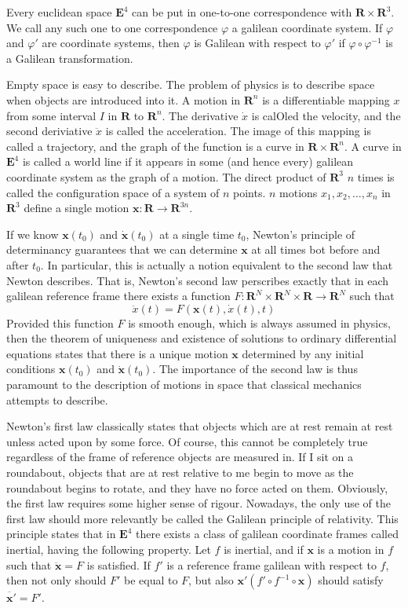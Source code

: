Every euclidean space $\mathbf{E}^4$ can be put in one-to-one correspondence with $\mathbf{R} \times \mathbf{R}^3$. We call any such one to one correspondence $\varphi$ a galilean coordinate system. If $\varphi$ and $\varphi'$ are coordinate systems, then $\varphi$ is Galilean with respect to $\varphi'$ if $\varphi \circ \varphi^{-1}$ is a Galilean transformation.

Empty space is easy to describe. The problem of physics is to describe space when objects are introduced into it. A motion in $\mathbf{R}^n$ is a differentiable mapping $x$ from some interval $I$ in $\mathbf{R}$ to $\mathbf{R}^n$. The derivative $\dot{x}$ is calOled the velocity, and the second deriviative $\ddot{x}$ is called the acceleration. The image of this mapping is called a trajectory, and the graph of the function is a curve in $\mathbf{R} \times \mathbf{R}^n$. A curve in $\mathbf{E}^4$ is called a world line if it appears in some (and hence every) galilean coordinate system as the graph of a motion. The direct product of $\mathbf{R}^3$ $n$ times is called the configuration space of a system of $n$ points. $n$ motions $x_1, x_2, \dots, x_n$ in $\mathbf{R}^3$ define a single motion $\mathbf{x}:\mathbf{R} \to \mathbf{R}^{3n}$.

If we know $\mathbf{x}(t_0)$ and $\dot{\mathbf{x}}(t_0)$ at a single time $t_0$, Newton's principle of determinancy guarantees that we can determine $\mathbf{x}$ at all times bot before and after $t_0$. In particular, this is actually a notion equivalent to the second law that Newton describes. That is, Newton's second law perscribes exactly that in each galilean reference frame there exists a function $F:\mathbf{R}^N \times \mathbf{R}^N \times \mathbf{R} \to \mathbf{R}^N$ such that
%
\[ \ddot{x}(t) = F(\mathbf{x}(t), \dot{x}(t), t) \]
%
Provided this function $F$ is smooth enough, which is always assumed in physics, then the theorem of uniqueness and existence of solutions to ordinary differential equations states that there is a unique motion $\mathbf{x}$ determined by any initial conditions $\mathbf{x}(t_0)$ and $\dot{\mathbf{x}}(t_0)$. The importance of the second law is thus paramount to the description of motions in space that classical mechanics attempts to describe.

Newton's first law classically states that objects which are at rest remain at rest unless acted upon by some force. Of course, this cannot be completely true regardless of the frame of reference objects are measured in. If I sit on a roundabout, objects that are at rest relative to me begin to move as the roundabout begins to rotate, and they have no force acted on them. Obviously, the first law requires some higher sense of rigour. Nowadays, the only use of the first law should more relevantly be called the Galilean principle of relativity. This principle states that in $\mathbf{E}^4$ there exists a class of galilean coordinate frames called inertial, having the following property. Let $f$ is inertial, and if $\mathbf{x}$ is a motion in $f$ such that $\ddot{\mathbf{x}} = F$ is satisfied. If $f'$ is a reference frame galilean with respect to $f$, then not only should $F'$ be equal to $F$, but also $\mathbf{x}' (f' \circ f^{-1} \circ \mathbf{x})$ should satisfy $\ddot{\mathbf{x}'} = F'$.

